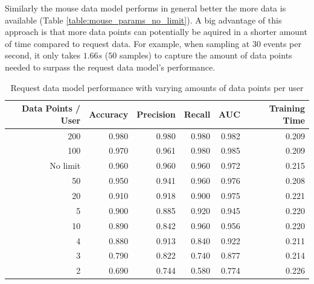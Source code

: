 \documentclass[
    fontsize=12pt,
    headings=small,
    parskip=half,           %
    bibliography=totoc,
    numbers=noenddot,       %
    open=any,               %
    final,                   %
    table
]{scrreprt}
\begin{document}
Similarly the mouse data model performs in general better the more data is available (Table \ref{table:mouse_params_no_limit}). A big advantage of this approach is that more data points can potentially be aquired in a shorter amount of time compared to request data. For example, when sampling at $30$ events per second, it only takes $1.66s$ ($50$ samples) to capture the amount of data points needed to surpass the request data model's performance.


\begin{table}[H]
    \begin{center}
        \begin{tabular}{rrrrrr}
            \toprule
            Data Points / User & Accuracy & Precision & Recall & AUC & Training Time \\
            \midrule
            200 & 0.980 & 0.980 & 0.980 & 0.982 & 0.209 \\
            100 & 0.970 & 0.961 & 0.980 & 0.985 & 0.209 \\
            No limit & 0.960 & 0.960 & 0.960 & 0.972 & 0.215 \\
            50 & 0.950 & 0.941 & 0.960 & 0.976 & 0.208 \\
            20 & 0.910 & 0.918 & 0.900 & 0.975 & 0.221 \\
            5 & 0.900 & 0.885 & 0.920 & 0.945 & 0.220 \\
            10 & 0.890 & 0.842 & 0.960 & 0.956 & 0.220 \\
            4 & 0.880 & 0.913 & 0.840 & 0.922 & 0.211 \\
            3 & 0.790 & 0.822 & 0.740 & 0.877 & 0.214 \\
            2 & 0.690 & 0.744 & 0.580 & 0.774 & 0.226 \\
            \bottomrule
        \end{tabular}
    \end{center}
    \caption{Request data model performance with varying amounts of data points per user}
    \label{table:request_params_no_limit}
\end{table}
\end{document}
